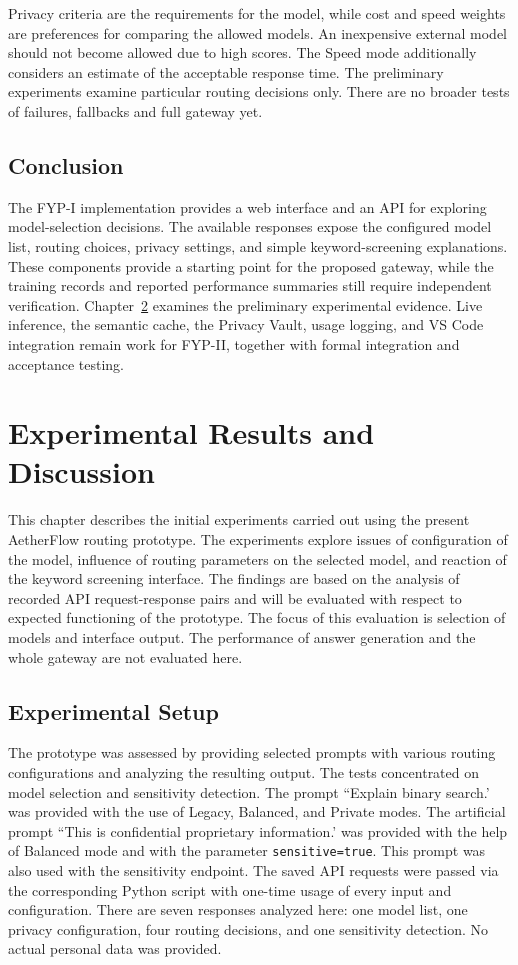 Privacy criteria are the requirements for the model, while cost and speed weights are preferences for comparing the allowed models. An inexpensive external model should not become allowed due to high scores. The Speed mode additionally considers an estimate of the acceptable response time. The preliminary experiments examine particular routing decisions only. There are no broader tests of failures, fallbacks and full gateway yet.

\section{Conclusion}
The FYP-I implementation provides a web interface and an API for exploring model-selection decisions. The available responses expose the configured model list, routing choices, privacy settings, and simple keyword-screening explanations. These components provide a starting point for the proposed gateway, while the training records and reported performance summaries still require independent verification. Chapter~\ref{ch:results} examines the preliminary experimental evidence. Live inference, the semantic cache, the Privacy Vault, usage logging, and VS Code integration remain work for FYP-II, together with formal integration and acceptance testing.

\clearpage


\chapter{Experimental Results and Discussion}
\label{ch:results}

This chapter describes the initial experiments carried out using the present AetherFlow routing prototype. The experiments explore issues of configuration of the model, influence of routing parameters on the selected model, and reaction of the keyword screening interface. The findings are based on the analysis of recorded API request-response pairs and will be evaluated with respect to expected functioning of the prototype. The focus of this evaluation is selection of models and interface output. The performance of answer generation and the whole gateway are not evaluated here.

\section{Experimental Setup}
The prototype was assessed by providing selected prompts with various routing configurations and analyzing the resulting output. The tests concentrated on model selection and sensitivity detection. The prompt ``Explain binary search.' was provided with the use of Legacy, Balanced, and Private modes. The artificial prompt ``This is confidential proprietary information.' was provided with the help of Balanced mode and with the parameter \texttt{sensitive=true}. This prompt was also used with the sensitivity endpoint. The saved API requests were passed via the corresponding Python script with one-time usage of every input and configuration. There are seven responses analyzed here: one model list, one privacy configuration, four routing decisions, and one sensitivity detection. No actual personal data was provided.

